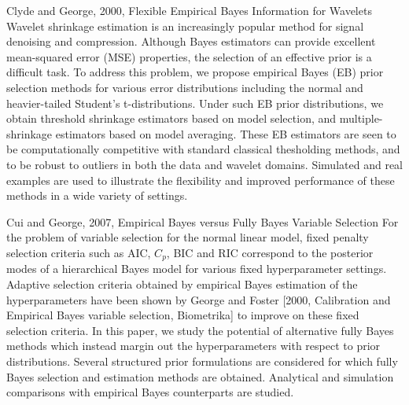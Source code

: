 \documentclass{amsart}[12pt]
\begin{document}
Clyde and George, 2000, Flexible Empirical Bayes Information for Wavelets
Wavelet shrinkage estimation is an increasingly popular method for signal denoising and compression. Although
Bayes estimators can provide excellent mean-squared error (MSE) properties, the selection of an effective
prior is a difficult task. To address this problem, we propose empirical Bayes (EB) prior selection methods for
various error distributions including the normal and heavier-tailed Student's t-distributions. Under such EB
prior distributions, we obtain threshold shrinkage estimators based on model selection, and multiple-shrinkage
estimators based on model averaging. These EB estimators are seen to be computationally competitive with standard
classical thesholding methods, and to be robust to outliers in both the data and wavelet domains. Simulated and
real examples are used to illustrate the flexibility and improved performance of these methods in a wide variety
of settings.

Cui and George, 2007, Empirical Bayes versus Fully Bayes Variable Selection
For the problem of variable selection for the normal linear model, fixed penalty selection criteria such as
AIC, $C_p$, BIC and RIC correspond to the posterior modes of a hierarchical Bayes model for various fixed
hyperparameter settings. Adaptive selection criteria obtained by empirical Bayes estimation of the
hyperparameters have been shown by George and Foster [2000, Calibration and Empirical Bayes variable selection,
Biometrika] to improve on these fixed selection criteria. In this paper, we study the potential of alternative
fully Bayes methods which instead margin out the hyperparameters with respect to prior distributions. Several
structured prior formulations are considered for which fully Bayes selection and estimation methods are
obtained. Analytical and simulation comparisons with empirical Bayes counterparts are studied.
\end{document}
